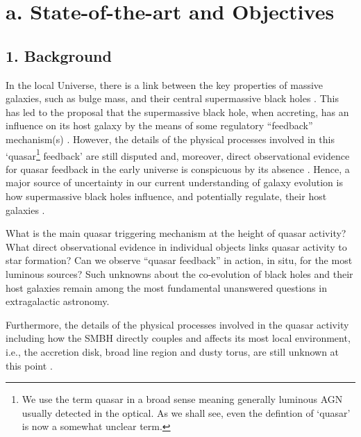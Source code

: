 
\section*{a. State-of-the-art and Objectives}

\subsection*{1. Background}
\noindent
In the local Universe, there is a link between the key properties of
massive galaxies, such as bulge mass, and their central supermassive
black holes \citep[SMBHs; e.g., ][]{McLure_Dunlop2002, HaringRix2004,
Salviander2007, Greene2010, KormendyHo2013}. This has led to the
proposal that the supermassive black hole, when accreting, has an
influence on its host galaxy by the means of some regulatory
``feedback'' mechanism(s) \citep[e.g., ][]{Sijacki2007, Hopkins2008a,
AlexanderHickox2012, Fabian2012, KingPounds2015}. However, the details
of the physical processes involved in this `quasar\footnote{We use
the term quasar in a broad sense meaning generally luminous AGN
usually detected in the optical. As we shall see, even the defintion
of `quasar' is now a somewhat unclear term.} feedback' are still
disputed and, moreover, direct observational evidence for quasar
feedback in the early universe is conspicuous by its absence
\citep[e.g., ][]{HeckmanBest2014, NaabOstriker2017}. Hence, a major
source of uncertainty in our current understanding of galaxy evolution
is how supermassive black holes influence, and potentially regulate,
their host galaxies \citep{Vogelsberger2013, Vogelsberger2014,
Schaye2015, Angles-Alcazar2013, Angles-Alcazar2017}.

\smallskip
\smallskip
\noindent
What is the main quasar triggering mechanism at the height of quasar
activity? What direct observational evidence in individual objects
links quasar activity to star formation?  Can we observe ``quasar feedback''
in action, in situ, for the most luminous sources?  Such unknowns
about the co-evolution of black holes and their host galaxies remain
among the most fundamental unanswered questions in extragalactic
astronomy.  

\smallskip 
\smallskip
\noindent
Furthermore, the details of the physical processes involved in the
quasar activity including how the SMBH directly couples and affects
its most local environment, i.e., the accretion disk, broad line
region and dusty torus, are still unknown at this point
\citep[e.g.,][]{Netzer2015, Padovani2017}.

